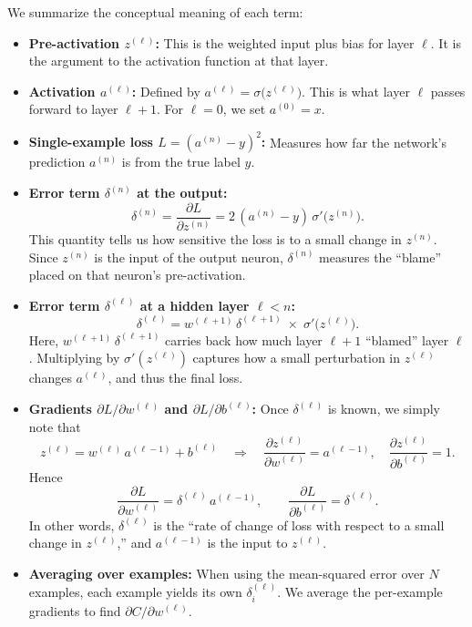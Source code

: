 \documentclass{article}
\begin{document}
\noindent We summarize the conceptual meaning of each term:

\begin{itemize}
    \item \textbf{Pre-activation \(z^{(\ell)}\):}  
      This is the weighted input plus bias for layer \(\ell\).  It is the argument to the activation function at that layer.

    \item \textbf{Activation \(a^{(\ell)}\):}  
      Defined by \(a^{(\ell)} = \sigma\bigl(z^{(\ell)}\bigr)\).  This is what layer \(\ell\) passes forward to layer \(\ell+1\).  For \(\ell=0\), we set \(a^{(0)} = x\).

    \item \textbf{Single-example loss \(L = {(a^{(n)} - y)}^2\):}  
      Measures how far the network's prediction \(a^{(n)}\) is from the true label \(y\).

    \item \textbf{Error term \(\delta^{(n)}\) at the output:}  
      \[
        \delta^{(n)} = \frac{\partial L}{\partial z^{(n)}} 
                     = 2\,(a^{(n)} - y)\,\sigma'\bigl(z^{(n)}\bigr).
      \]
      This quantity tells us how sensitive the loss is to a small change in \(z^{(n)}\).  Since \(z^{(n)}\) is the input of the output neuron, \(\delta^{(n)}\) measures the “blame” placed on that neuron's pre-activation.

    \item \textbf{Error term \(\delta^{(\ell)}\) at a hidden layer \(\ell < n\):}  
      \[
        \delta^{(\ell)} 
        = w^{(\ell+1)}\,\delta^{(\ell+1)} \;\times\; \sigma'\bigl(z^{(\ell)}\bigr).
      \]
      Here, \(w^{(\ell+1)}\,\delta^{(\ell+1)}\) carries back how much layer \(\ell+1\) “blamed” layer \(\ell\).  Multiplying by \(\sigma'(z^{(\ell)})\) captures how a small perturbation in \(z^{(\ell)}\) changes \(a^{(\ell)}\), and thus the final loss.

    \item \textbf{Gradients \(\partial L/\partial w^{(\ell)}\) and \(\partial L/\partial b^{(\ell)}\):}  
      Once \(\delta^{(\ell)}\) is known, we simply note that 
      \[
        z^{(\ell)} = w^{(\ell)}\,a^{(\ell-1)} + b^{(\ell)} 
        \quad\Longrightarrow\quad
        \frac{\partial z^{(\ell)}}{\partial w^{(\ell)}} = a^{(\ell-1)}, 
        \quad
        \frac{\partial z^{(\ell)}}{\partial b^{(\ell)}} = 1.
      \]
      Hence 
      \[
        \frac{\partial L}{\partial w^{(\ell)}} 
        = \delta^{(\ell)}\,a^{(\ell-1)}, 
        \qquad
        \frac{\partial L}{\partial b^{(\ell)}} 
        = \delta^{(\ell)}.
      \]
      In other words, \(\delta^{(\ell)}\) is the ``rate of change of loss with respect to a small change in {\(z^{(\ell)}\),}'' and \(a^{(\ell-1)}\) is the input to \(z^{(\ell)}\).  

    \item \textbf{Averaging over examples:}  
      When using the mean-squared error over \(N\) examples, each example yields its own \(\delta_i^{(\ell)}\).  We average the per-example gradients to find \(\partial C/\partial w^{(\ell)}\).  
\end{itemize}
\end{document}

